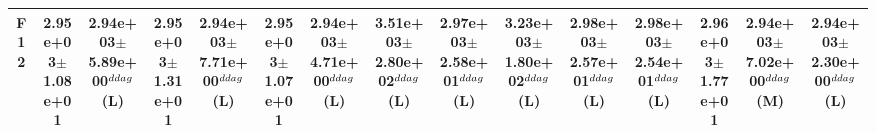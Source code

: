 \begin{table}[!t]
\begin{tabular}{c|cccccccccccccc}
F12  & 2.95e+03$\pm$1.08e+01  & 2.94e+03$\pm$5.89e+00$^{\\ddag}$ (L)  & 2.95e+03$\pm$1.31e+01   & 2.94e+03$\pm$7.71e+00$^{\\ddag}$ (L)  & 2.95e+03$\pm$1.07e+01   & 2.94e+03$\pm$4.71e+00$^{\\ddag}$ (L)  & \textbf{3.51e+03$\pm$2.80e+02}$^{\\ddag}$ (L)  & \textbf{2.97e+03$\pm$2.58e+01}$^{\\ddag}$ (L)  & \textbf{3.23e+03$\pm$1.80e+02}$^{\\ddag}$ (L)  & \textbf{2.98e+03$\pm$2.57e+01}$^{\\ddag}$ (L)  & \textbf{2.98e+03$\pm$2.54e+01}$^{\\ddag}$ (L)  & 2.96e+03$\pm$1.77e+01   & 2.94e+03$\pm$7.02e+00$^{\\ddag}$ (M)  & 2.94e+03$\pm$2.30e+00$^{\\ddag}$ (L) \\ \hline
\end{tabular}
\end{table}
